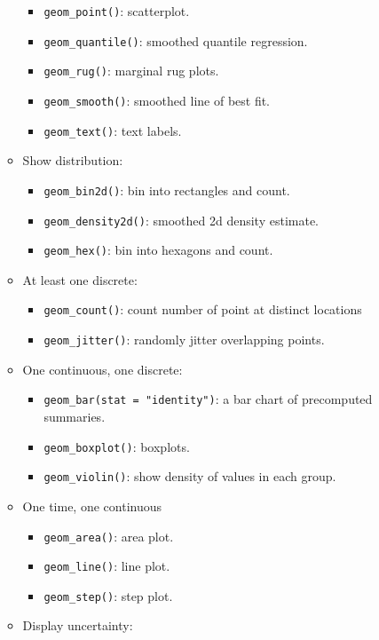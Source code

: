 \begin{itemize}
\begin{itemize}
    \begin{itemize}
    \tightlist
    \item
      \texttt{geom\_point()}: scatterplot.
    \item
      \texttt{geom\_quantile()}: smoothed quantile regression.
    \item
      \texttt{geom\_rug()}: marginal rug plots.
    \item
      \texttt{geom\_smooth()}: smoothed line of best fit.
    \item
      \texttt{geom\_text()}: text labels.
    \end{itemize}
  \item
    Show distribution:

    \begin{itemize}
    \tightlist
    \item
      \texttt{geom\_bin2d()}: bin into rectangles and count.
    \item
      \texttt{geom\_density2d()}: smoothed 2d density estimate.
    \item
      \texttt{geom\_hex()}: bin into hexagons and count.
    \end{itemize}
  \item
    At least one discrete:

    \begin{itemize}
    \tightlist
    \item
      \texttt{geom\_count()}: count number of point at distinct
      locations
    \item
      \texttt{geom\_jitter()}: randomly jitter overlapping points.
    \end{itemize}
  \item
    One continuous, one discrete:

    \begin{itemize}
    \tightlist
    \item
      \texttt{geom\_bar(stat\ =\ "identity")}: a bar chart of
      precomputed summaries.
    \item
      \texttt{geom\_boxplot()}: boxplots.
    \item
      \texttt{geom\_violin()}: show density of values in each group.
    \end{itemize}
  \item
    One time, one continuous

    \begin{itemize}
    \tightlist
    \item
      \texttt{geom\_area()}: area plot.
    \item
      \texttt{geom\_line()}: line plot.
    \item
      \texttt{geom\_step()}: step plot.
    \end{itemize}
  \item
    Display uncertainty:


\end{itemize}
\end{itemize}
